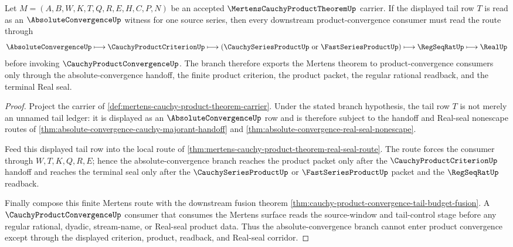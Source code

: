 \begin{theorem}
\label{thm:mertens-absolute-convergence-product-route}
Let $M=(A,B,W,K,T,Q,R,E,H,C,P,N)$ be an accepted $\MertensCauchyProductTheoremUp$ carrier. If the displayed tail row $T$ is read as an $\AbsoluteConvergenceUp$ witness for one source series, then every downstream product-convergence consumer must read the route through
$$
\AbsoluteConvergenceUp \longmapsto \CauchyProductCriterionUp \longmapsto
(\CauchySeriesProductUp\ \text{or}\ \FastSeriesProductUp) \longmapsto
\RegSeqRatUp \longmapsto \RealUp
$$
before invoking $\CauchyProductConvergenceUp$. The branch therefore exports the Mertens theorem to product-convergence consumers only through the absolute-convergence handoff, the finite product criterion, the product packet, the regular rational readback, and the terminal Real seal.
\end{theorem}
\begin{proof}
Project the carrier of \autoref{def:mertens-cauchy-product-theorem-carrier}. Under the stated branch hypothesis, the tail row $T$ is not merely an unnamed tail ledger: it is displayed as an $\AbsoluteConvergenceUp$ row and is therefore subject to the handoff and Real-seal nonescape routes of \autoref{thm:absolute-convergence-cauchy-majorant-handoff} and \autoref{thm:absolute-convergence-real-seal-nonescape}.

Feed this displayed tail row into the local route of \autoref{thm:mertens-cauchy-product-theorem-real-seal-route}. The route forces the consumer through $W,T,K,Q,R,E$; hence the absolute-convergence branch reaches the product packet only after the $\CauchyProductCriterionUp$ handoff and reaches the terminal seal only after the $\CauchySeriesProductUp$ or $\FastSeriesProductUp$ packet and the $\RegSeqRatUp$ readback.

Finally compose this finite Mertens route with the downstream fusion theorem \autoref{thm:cauchy-product-convergence-tail-budget-fusion}. A $\CauchyProductConvergenceUp$ consumer that consumes the Mertens surface reads the source-window and tail-control stage before any regular rational, dyadic, stream-name, or Real-seal product data. Thus the absolute-convergence branch cannot enter product convergence except through the displayed criterion, product, readback, and Real-seal corridor.
\end{proof}


